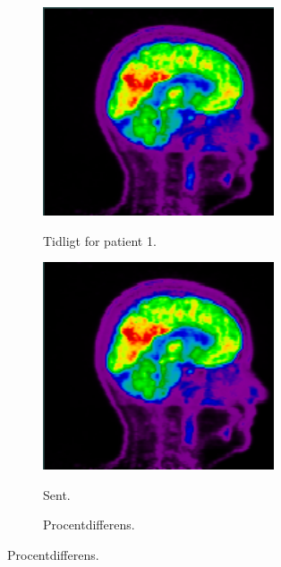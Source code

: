 \begin{figure}
    \centering
    \begin{subfigure}[b]{0.3\textwidth}
        \caption{Tidligt for patient 1.}
        \includegraphics[width=0.75\textwidth]{colager/over_tid_pet/over_tid_121280_early.png}
        \label{col:over_time_pet_pat1_early}
    \end{subfigure}\hfill
    \begin{subfigure}[b]{0.3\textwidth}
        \caption{Sent.}
        \includegraphics[width=0.75\textwidth]{colager/over_tid_pet/over_tid_121280_late.png}
        \label{col:over_time_pet_pat1_late}
    \end{subfigure}\hfill
    \begin{subfigure}[b]{0.3\textwidth}
        \caption{Procentdifferens.}

\end{subfigure}
\end{figure}
